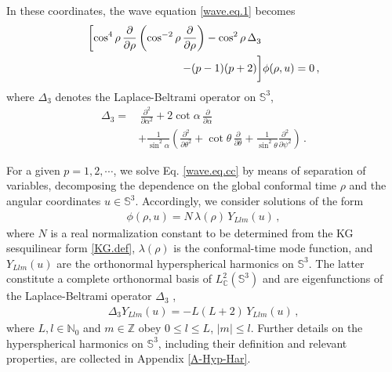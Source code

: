 \documentclass[aps,twocolumn,nofootinbib]{revtex4}
\begin{document}
In these coordinates, the wave equation \eqref{wave.eq.1} becomes
\begin{align} \label{wave.eq.cc}
    \left[\cos_{}^{4}\rho \, \frac{\partial}{\partial\rho} \left(\cos_{}^{-2}\rho \, \frac{\partial}{\partial\rho}\right) - \cos_{}^{2}\rho \, \Delta_{3}^{} \right.& \nonumber \\ 
    \left. - (p-1)(p+2)\vphantom{\cos_{}^{4}\rho \, \frac{\partial}{\partial\rho}\left(\cos_{}^{-2}\rho \, \frac{\partial}{\partial\rho}\right) -  \cos_{}^{2}\rho \, \Delta_{3}^{}}\right]&\phi(\rho,u) =0\,,
\end{align}
where $\Delta_3^{}$ denotes the Laplace-Beltrami operator on $\mathbb{S}_{}^3$,
\begin{align} \label{LB-S3}
    \Delta_3 =&\, \frac{\partial^2}{\partial\alpha^2} +2\cot\alpha\,\frac{\partial}{\partial\alpha}\nonumber\\
    &+ \frac{1}{\sin^2\alpha}\left(\frac{\partial^2}{\partial\theta^2}+\cot\theta\,\frac{\partial}{\partial\theta}+\frac{1}{\sin^2\theta}\frac{\partial^2}{\partial\psi^2}\right)\,.  
\end{align}

For a given $p=1,2,\cdots$, we solve Eq. \eqref{wave.eq.cc} by means of separation of variables, decomposing the dependence on the global conformal time $\rho$ and the angular coordinates $u\in{\mathbb{S}}^3$. Accordingly, we consider solutions of the form
\begin{align}\label{psi.sep}
    \phi(\rho,u) = N\, \lambda(\rho) \,Y_{Llm}(u) \,,
\end{align}
where $N$ is a real normalization constant to be determined from the KG sesquilinear form \eqref{KG.def}, $\lambda(\rho)$ is the conformal-time mode function, and $Y_{Llm}(u)$ are the orthonormal hyperspherical harmonics on ${\mathbb{S}}^3$. The latter constitute a complete orthonormal basis of $L^2_{\mathbb{C}}({\mathbb{S}}^3)$ and are eigenfunctions of the Laplace-Beltrami operator $\Delta_3$ \cite{Avery},
\begin{align}\label{S3-eigenvalue}
    \Delta_3 Y_{Llm}(u) = -L(L+2)\,Y_{Llm}(u) \,,
\end{align}
where $L,l\in\mathbb N_0$ and $m\in\mathbb Z$ obey $0\leqslant l\leqslant L$, $|m|\leqslant l$. Further details on the hyperspherical harmonics on ${\mathbb{S}}^3$, including their definition and relevant properties, are collected in Appendix \ref{A-Hyp-Har}.
\end{document}
